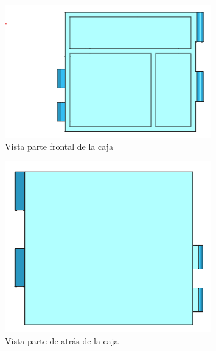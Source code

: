 \begin{figure}[H]
	\centering
	\includegraphics[width=0.8\textwidth]{images/4-DesarrolloTeorico/4-1-caja/CAJA_3D_FRONTAL.png}
	\caption{Vista parte frontal de la caja}
\end{figure}

\begin{figure}[H]
	\centering
	\includegraphics[width=0.8\textwidth]{images/4-DesarrolloTeorico/4-1-caja/CAJA_3D_ATRAS.png}
	\caption{Vista parte de atrás de la caja}
\end{figure}